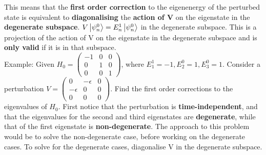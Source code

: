 \documentclass{article}
\begin{document}
\begin{flushleft}
This means that the \textbf{first order correction} to the eigenenergy of the perturbed state is equivalent to \textbf{diagonalising} the \textbf{action of V }on the eigenstate in the \textbf{degenerate subspace}. $V\ket{\psi_n^0}=E_n^1\ket{\psi_n^0}$ in the degenerate subspace. This is a projection of the action of V on the eigenstate in the degenerate subspace and is \textbf{only valid} if it is in that subspace.\\[0.5cm]
Example: Given $H_0=\begin{pmatrix}
    -1 & 0 & 0\\
    0 & 1 & 0\\
    0 & 0 & 1
\end{pmatrix}$, where $E_1^1=-1, E_2^0=1, E_3^0=1$. Consider a perturbation $V=\begin{pmatrix}
    0 & -\epsilon & 0 \\
    -\epsilon & 0 & 0\\
    0 & 0 & 0
\end{pmatrix}$. Find the first order corrections to the eigenvalues of $H_0$. First notice that the perturbation is \textbf{time-independent}, and that the eigenvalues for the second and third eigenstates are \textbf{degenerate}, while that of the first eigenstate is \textbf{non-degenerate}. The approach to this problem would be to solve the non-degenerate case, before working on the degenerate cases. To solve for the degenerate cases, diagonalise V in the degenerate subspace.


\end{flushleft}
\end{document}
